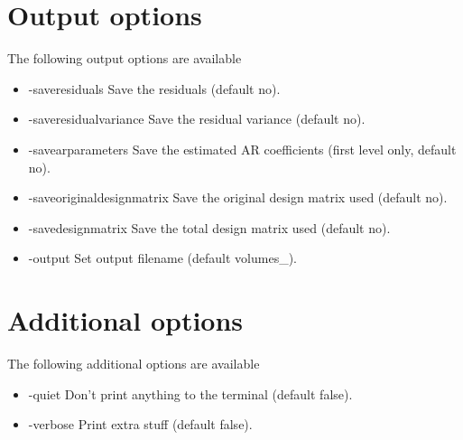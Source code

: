 \section{Output options}

The following output options are available

\begin{itemize}


\item -saveresiduals
\newline \newline Save the residuals (default no). 

\item -saveresidualvariance
\newline \newline Save the residual variance (default no).

\item -savearparameters
\newline \newline Save the estimated AR coefficients (first level only, default no).

\item -saveoriginaldesignmatrix
\newline \newline Save the original design matrix used (default no).

\item -savedesignmatrix
\newline \newline Save the total design matrix used (default no).

\item -output 
\newline \newline Set output filename (default volumes\_).

\end{itemize}

\section{Additional options}

The following additional options are available

\begin{itemize}

\item -quiet 
\newline \newline Don't print anything to the terminal (default false). 

\item -verbose
\newline \newline Print extra stuff (default false). 

\end{itemize}


